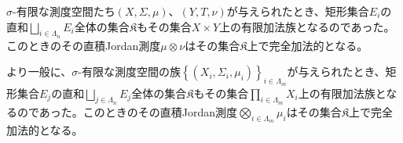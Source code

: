 \documentclass[dvipdfmx]{jsarticle}
\begin{document}
\begin{thm}\label{4.5.7.6}
$\sigma$-有限な測度空間たち$(X,\varSigma,\mu)$、$(Y,T,\nu)$が与えられたとき、矩形集合$E_{i}$の直和$\bigsqcup_{i \in \varLambda_{n}} E_{i}$全体の集合$\mathfrak{K}$もその集合$X \times Y$上の有限加法族となるのであった。このときのその直積Jordan測度$\mu \otimes \nu$はその集合$\mathfrak{K}$上で完全加法的となる。\par
より一般に、$\sigma$-有限な測度空間の族$\left\{ \left( X_{i},\varSigma_{i},\mu_{i} \right) \right\}_{i \in \varLambda_{m} }$が与えられたとき、矩形集合$E_{j}$の直和$\bigsqcup_{j \in \varLambda_{n} } E_{j}$全体の集合$\mathfrak{K}$もその集合$\prod_{i \in \varLambda_{m} } X_{i}$上の有限加法族となるのであった。このときのその直積Jordan測度$\bigotimes_{i \in \varLambda_{m} } \mu_{i}$はその集合$\mathfrak{K}$上で完全加法的となる。
\end{thm}
\end{document}
